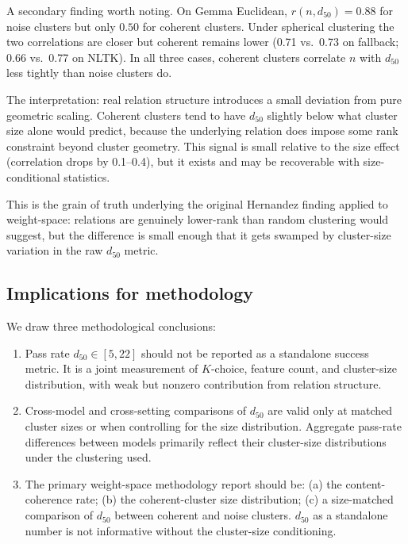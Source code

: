 \documentclass[11pt,letterpaper]{article}
\begin{document}
A secondary finding worth noting. On Gemma Euclidean, $r(n, d_{50}) = 0.88$ for noise clusters but only $0.50$ for coherent clusters. Under spherical clustering the two correlations are closer but coherent remains lower (0.71 vs.\ 0.73 on fallback; 0.66 vs.\ 0.77 on NLTK). In all three cases, coherent clusters correlate $n$ with $d_{50}$ less tightly than noise clusters do.

The interpretation: real relation structure introduces a small deviation from pure geometric scaling. Coherent clusters tend to have $d_{50}$ slightly below what cluster size alone would predict, because the underlying relation does impose some rank constraint beyond cluster geometry. This signal is small relative to the size effect (correlation drops by 0.1--0.4), but it exists and may be recoverable with size-conditional statistics.

This is the grain of truth underlying the original Hernandez finding applied to weight-space: relations are genuinely lower-rank than random clustering would suggest, but the difference is small enough that it gets swamped by cluster-size variation in the raw $d_{50}$ metric.

\subsection{Implications for methodology}

We draw three methodological conclusions:

\begin{enumerate}[leftmargin=*]
\item Pass rate $d_{50} \in [5, 22]$ should not be reported as a standalone success metric. It is a joint measurement of $K$-choice, feature count, and cluster-size distribution, with weak but nonzero contribution from relation structure.
\item Cross-model and cross-setting comparisons of $d_{50}$ are valid only at matched cluster sizes or when controlling for the size distribution. Aggregate pass-rate differences between models primarily reflect their cluster-size distributions under the clustering used.
\item The primary weight-space methodology report should be: (a) the content-coherence rate; (b) the coherent-cluster size distribution; (c) a size-matched comparison of $d_{50}$ between coherent and noise clusters. $d_{50}$ as a standalone number is not informative without the cluster-size conditioning.
\end{enumerate}
\end{document}
